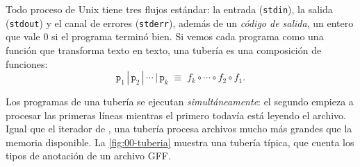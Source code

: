 Todo proceso de Unix tiene tres flujos estándar: la entrada (\texttt{stdin}), la salida (\texttt{stdout}) y el canal de errores (\texttt{stderr}), además de un \emph{código de salida}, un entero que vale 0 si el programa terminó bien. Si vemos cada programa como una función que transforma texto en texto, una tubería es una composición de funciones:
\begin{equation}\label{eq:00-tuberia}
\texttt{p}_1 \,|\, \texttt{p}_2 \,|\, \cdots \,|\, \texttt{p}_k \;\equiv\; f_k\circ\cdots\circ f_2\circ f_1 .
\end{equation}

\begin{simbolos}
\end{simbolos}

Los programas de una tubería se ejecutan \emph{simultáneamente}: el segundo empieza a procesar las primeras líneas mientras el primero todavía está leyendo el archivo. Igual que el iterador de , una tubería procesa archivos mucho más grandes que la memoria disponible. La \cref{fig:00-tuberia} muestra una tubería típica, que cuenta los tipos de anotación de un archivo GFF.

